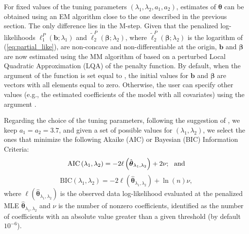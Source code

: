 For fixed values of the tuning parameters $(\lambda_1,\lambda_2,a_1,a_2)$, estimates of $\boldsymbol{\theta}$ can be obtained using an EM algorithm close to the one described in the previous section. 
The only difference lies in the M-step. Given that the penalized log-likelihoods $\ell_1^P \left(\textbf{b};\lambda_{1}\right)$ and $\tilde{\ell}_2^P \left(\boldsymbol{\beta};\lambda_{2}\right)$, where $\tilde{\ell}_2^P \left(\boldsymbol{\beta};\lambda_{2}\right)$ is the logarithm of (\ref{eq:partial_like}), are non-concave and non-differentiable at the origin, $\textbf{b}$ and $\boldsymbol{\beta}$ are now estimated using the MM algorithm of \citet{Hunter_Li_2005} based on a perturbed Local Quadratic Approximation (LQA) of the penalty function. By default, when the argument  of the function  is set equal to , the initial values for $\mathbf{b}$ and $\boldsymbol{\beta}$ are vectors with all elements equal to zero. Otherwise, the user can specify other values (e.g., the estimated coefficients of the model with all covariates) using the argument .

Regarding the choice of the tuning parameters, following the suggestion of \citet{Fan_Li_2001}, we keep $a_1=a_2=3.7$, and given a set of possible values for $(\lambda_1,\lambda_2)$, we select the ones that minimize the following Akaike (AIC) or Bayesian (BIC) Information Criteria: 
$$\mathrm{AIC}\left(\lambda_{1},\lambda_{2}\right)=-2\ell\left(\hat{\boldsymbol{\theta}}_{\lambda_{1},\lambda_{2}}\right) + 2 \nu; \ \hbox{ and}$$
$$\mathrm{BIC}\left(\lambda_{1},\lambda_{2}\right)=-2\ell\left(\hat{\boldsymbol{\theta}}_{\lambda_{1},\lambda_{2}}\right) + \ln(n) \nu,$$
where $\ell\left(\hat{\boldsymbol{\theta}}_{\lambda_{1},\lambda_{2}}\right)$ is the observed data log-likelihood evaluated at the penalized MLE $\hat{\boldsymbol{\theta}}_{\lambda_{1},\lambda_{2}}$ and $\nu$ is the number of nonzero coefficients, identified as the number of coefficients with an absolute value greater than a given threshold (by default $10^{-6}$).






